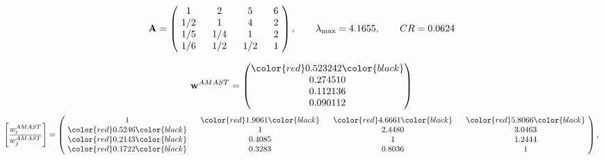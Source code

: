\begin{example}
\begin{equation*}
\mathbf{A} =
\begin{pmatrix}
$\,\,$ 1 $\,\,$ & $\,\,$2$\,\,$ & $\,\,$5$\,\,$ & $\,\,$6 $\,\,$ \\
$\,\,$ 1/2$\,\,$ & $\,\,$ 1 $\,\,$ & $\,\,$4$\,\,$ & $\,\,$2 $\,\,$ \\
$\,\,$ 1/5$\,\,$ & $\,\,$ 1/4$\,\,$ & $\,\,$ 1 $\,\,$ & $\,\,$2 $\,\,$ \\
$\,\,$ 1/6$\,\,$ & $\,\,$ 1/2$\,\,$ & $\,\,$ 1/2$\,\,$ & $\,\,$ 1  $\,\,$ \\
\end{pmatrix},
\qquad
\lambda_{\max} =
4.1655,
\qquad
CR = 0.0624
\end{equation*}

\begin{equation*}
\mathbf{w}^{AMAST} =
\begin{pmatrix}
\color{red} 0.523242\color{black} \\
0.274510\\
0.112136\\
0.090112
\end{pmatrix}\end{equation*}
\begin{equation*}
\left[ \frac{{w}^{AMAST}_i}{{w}^{AMAST}_j} \right] =
\begin{pmatrix}
$\,\,$ 1 $\,\,$ & $\,\,$\color{red} 1.9061\color{black} $\,\,$ & $\,\,$\color{red} 4.6661\color{black} $\,\,$ & $\,\,$\color{red} 5.8066\color{black} $\,\,$ \\
$\,\,$\color{red} 0.5246\color{black} $\,\,$ & $\,\,$ 1 $\,\,$ & $\,\,$2.4480$\,\,$ & $\,\,$3.0463  $\,\,$ \\
$\,\,$\color{red} 0.2143\color{black} $\,\,$ & $\,\,$0.4085$\,\,$ & $\,\,$ 1 $\,\,$ & $\,\,$1.2444 $\,\,$ \\
$\,\,$\color{red} 0.1722\color{black} $\,\,$ & $\,\,$0.3283$\,\,$ & $\,\,$0.8036$\,\,$ & $\,\,$ 1  $\,\,$ \\
\end{pmatrix},
\end{equation*}


\end{example}
